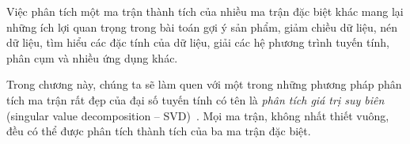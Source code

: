 Việc phân tích một ma trận thành tích của nhiều ma trận đặc biệt khác mang lại
những ích lợi quan trọng trong bài toán gợi ý sản phẩm, giảm chiều dữ liệu, nén dữ liệu,
tìm hiểu các đặc tính của dữ liệu, giải các hệ phương trình tuyến tính,
phân cụm và nhiều ứng dụng khác.

Trong chương này, chúng ta sẽ làm quen với một trong những phương pháp phân tích
ma trận rất đẹp của đại số tuyến tính có tên là \textit{phân tích giá trị suy
biên} (singular value decomposition -- SVD)~\cite{golub1970singular}. Mọi ma
trận, không nhất thiết vuông, đều có thể được phân tích thành tích của ba ma
trận đặc biệt.












